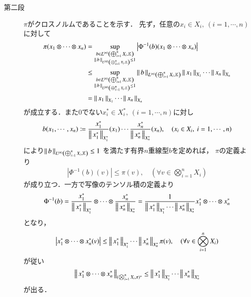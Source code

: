 \begin{prf}
\begin{description}
			\item[第二段]
				$\pi$がクロスノルムであることを示す．
				先ず，任意の$x_i \in X_i,\ (i=1,\cdots,n)$に対して
				\begin{align}
					\pi(x_1 \otimes \cdots \otimes x_n) 
					&= \sup{\substack{b \in \ContLn{\bigoplus_{i=1}^n X_i}{\K}{n} \\ \Norm{b}{\ContLn{\bigoplus_{i=1}^n X_i}{\K}{n}} \leq 1}}{\left| \Phi^{-1}(b)(x_1 \otimes \cdots \otimes x_n) \right|} \\
					&\leq \sup{\substack{b \in \ContLn{\bigoplus_{i=1}^n X_i}{\K}{n} \\ \Norm{b}{\ContLn{\bigoplus_{i=1}^n X_i}{\K}{n}} \leq 1}}{\Norm{b}{\ContLn{\bigoplus_{i=1}^n X_i}{\K}{n}}\Norm{x_1}{X_1} \cdots \Norm{x_n}{X_n}} \\
					&= \Norm{x_1}{X_1} \cdots \Norm{x_n}{X_n}
				\end{align}
				が成立する．また0でない$x_i^* \in X_i^*,\ (i=1,\cdots,n)$に対し
				\begin{align}
					b(x_1,\cdots,x_n) 
					\coloneqq \frac{x_1^*}{\Norm{x_1^*}{X_1^*}}(x_1) \cdots \frac{x_n^*}{\Norm{x_n^*}{X_n^*}}(x_n),
					\quad (x_i \in X_i,\ i=1,\cdots,n)
				\end{align}
				により$\Norm{b}{\ContLn{\bigoplus_{i=1}^n X_i}{\K}{n}} \leq 1$
				を満たす有界$n$重線型$b$を定めれば，
				$\pi$の定義より
				\begin{align}
					\left| \Phi^{-1}(b)(v) \right| \leq \pi(v),
					\quad (\forall v \in \bigotimes_{i=1}^n X_i)
				\end{align}
				が成り立つ．一方で写像のテンソル積の定義より
				\begin{align}
					\Phi^{-1}(b) 
					= \frac{x_1^*}{\Norm{x_1^*}{X_1^*}} 
						\otimes \cdots \otimes \frac{x_n^*}{\Norm{x_n^*}{X_n^*}}
					= \frac{1}{\Norm{x_1^*}{X_1^*} \cdots \Norm{x_n^*}{X_n^*}} 
						x_1^* \otimes \cdots \otimes x_n^*
				\end{align}
				となり，
				\begin{align}
					\left| x_1^* \otimes \cdots \otimes x_n^*(v) \right| 
						\leq \Norm{x_1^*}{X_1^*} \cdots \Norm{x_n^*}{X_n^*} \pi(v),
					\quad (\forall v \in \bigotimes_{i=1}^n X_i)
				\end{align}
				が従い
				\begin{align}
					\Norm{x_1^* \otimes \cdots \otimes x_n^*}{(\bigotimes_{i=1}^n X_i,\pi)^*} 
					\leq \Norm{x_1^*}{X_1^*} \cdots \Norm{x_n^*}{X_n^*}
				\end{align}
				が出る．
				

\end{description}
\end{prf}
